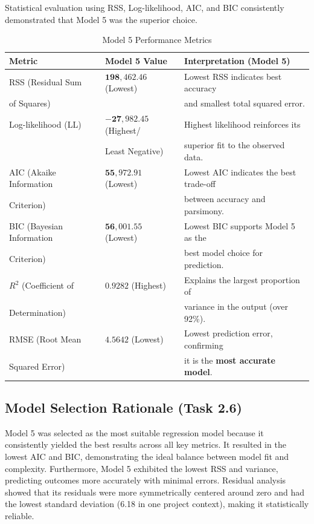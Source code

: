\documentclass[12pt,a4paper]{article}
\begin{document}
Statistical evaluation using RSS, Log-likelihood, AIC, and BIC consistently demonstrated that Model 5 was the superior choice.

\begin{table}[H]
\centering
\caption{Model 5 Performance Metrics}
\begin{tabular}{@{}lll@{}}
\toprule
\textbf{Metric} & \textbf{Model 5 Value} & \textbf{Interpretation (Model 5)} \\
\midrule
RSS (Residual Sum & $\mathbf{198{,}462.46}$ (Lowest) & Lowest RSS indicates best accuracy \\
of Squares) & & and smallest total squared error. \\
Log-likelihood (LL) & $\mathbf{-27{,}982.45}$ (Highest/ & Highest likelihood reinforces its \\
 & Least Negative) & superior fit to the observed data. \\
AIC (Akaike Information & $\mathbf{55{,}972.91}$ (Lowest) & Lowest AIC indicates the best trade-off \\
Criterion) & & between accuracy and parsimony. \\
BIC (Bayesian Information & $\mathbf{56{,}001.55}$ (Lowest) & Lowest BIC supports Model 5 as the \\
Criterion) & & best model choice for prediction. \\
$R^2$ (Coefficient of & $\mathbf{0.9282}$ (Highest) & Explains the largest proportion of \\
Determination) & & variance in the output (over 92\%). \\
RMSE (Root Mean & $\mathbf{4.5642}$ (Lowest) & Lowest prediction error, confirming \\
Squared Error) & & it is the \textbf{most accurate model}. \\
\bottomrule
\end{tabular}
\end{table}

\subsection{Model Selection Rationale (Task 2.6)}

Model 5 was selected as the most suitable regression model because it consistently yielded the best results across all key metrics. It resulted in the lowest AIC and BIC, demonstrating the ideal balance between model fit and complexity. Furthermore, Model 5 exhibited the lowest RSS and variance, predicting outcomes more accurately with minimal errors. Residual analysis showed that its residuals were more symmetrically centered around zero and had the lowest standard deviation (6.18 in one project context), making it statistically reliable.
\end{document}
